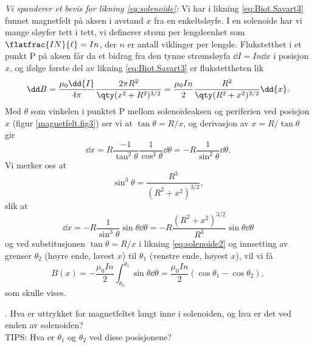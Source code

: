 \documentclass[../Elmag-labhefte-2020.tex]{subfiles}
\begin{document}
\emph{Vi spanderer et bevis for likning \eqref{eq:solenoide}:}  Vi har i likning \eqref{eq:Biot.Savart3} funnet magnetfelt på aksen i avstand $x$ fra en enkeltsløyfe. I en solenoide har vi mange sløyfer tett i tett, vi definerer strøm per lengdeenhet som $\flatfrac{I N}{\ell} = I n$, der $n$ er antall viklinger per lengde. Flukstetthet i et punkt P på aksen får da et bidrag fra den tynne strømsløyfa $\dd{I} = I n \dd{x}$ i posisjon $x$, og ifølge første del av likning \eqref{eq:Biot.Savart3} er flukstettheten lik
\begin{equation}
    \dd B 
        = \frac{\mu_0 \dd{I}}{4 \pi} \frac{2\pi R^2}{\qty(x^2 + R^2)^{3/2}}
        = \frac{\mu_0 I n}{2}  \frac{R^2}{ \qty( R^2 + x^2)^{3/2}} \dd{x} .
    \label{eq:solenoide2}
\end{equation}
%
Med $\theta$ som vinkelen i punktet P mellom solenoideaksen og periferien ved posisjon $x$ (figur \ref{magnetfelt.fig3}) ser vi at $\tan \theta = R / x$, og derivasjon av $x = R / \tan \theta$ gir 
\begin{equation}
    \dd{x} 
        = R \frac{-1}{\tan^2 \theta} \frac{1}{\cos^2\theta} \dd{\theta} 
        = -R \frac{1}{\sin^2\theta} \dd{\theta} .
\end{equation}
%
Vi merker oss at
\begin{equation}
    \sin^3 \theta = \frac{R^3}{(R^2 + x^2)^{3/2}},
\end{equation}
slik at 
\begin{equation}
    \dd{x} 
        = -R \frac{1}{\sin^3\theta} \sin\theta \dd{\theta}
        = -R \frac{(R^2 + x^2)^{3/2}}{R^3} \sin\theta \dd{\theta}
\end{equation}
og ved substitusjonen $\tan \theta = R / x$ i likning \eqref{eq:solenoide2} og innsetting av grenser $\theta_2$ (høyre ende, lavest $x$)  til $\theta_1$ (venstre ende, høyest $x$), vil vi få 
%
\begin{equation}
    B(x) 
        = -\frac{\mu_0 I n}{2} \int_{\theta_2}^{\theta_1} \sin \theta \dd{\theta}
        = \frac{\mu_0 I n}{2} (\cos \theta_1 - \cos \theta_2),
    \label{eq:solenoide3}
\end{equation}
som skulle vises. 

{. Hva  er uttrykket for magnetfeltet langt inne i solenoiden, og hva er det ved enden av solenoiden?}
\\
TIPS: Hva er $\theta_1$ og $\theta_2$ ved disse posisjonene?
\end{document}
